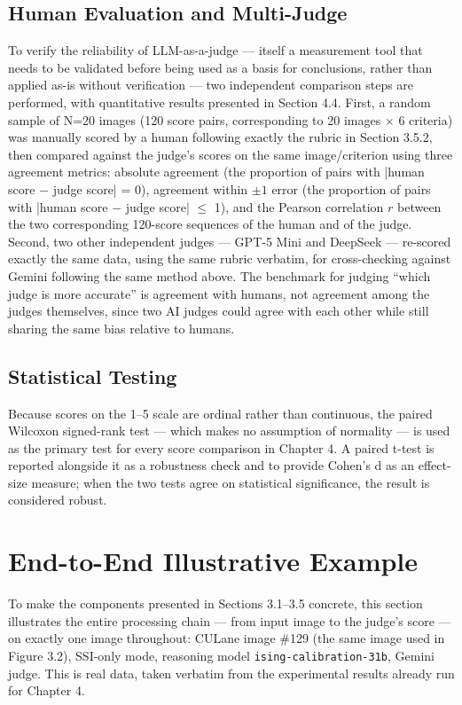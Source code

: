 \documentclass[12pt,a4paper]{report}
\begin{document}
\subsection{Human Evaluation and Multi-Judge}

To verify the reliability of LLM-as-a-judge --- itself a measurement tool that needs to be validated before being used as a basis for conclusions, rather than applied as-is without verification --- two independent comparison steps are performed, with quantitative results presented in Section 4.4. First, a random sample of N=20 images (120 score pairs, corresponding to 20 images $\times$ 6 criteria) was manually scored by a human following exactly the rubric in Section 3.5.2, then compared against the judge's scores on the same image/criterion using three agreement metrics: absolute agreement (the proportion of pairs with |human score $-$ judge score| = 0), agreement within $\pm 1$ error (the proportion of pairs with |human score $-$ judge score| $\le$ 1), and the Pearson correlation $r$ between the two corresponding 120-score sequences of the human and of the judge. Second, two other independent judges --- GPT-5 Mini and DeepSeek --- re-scored exactly the same data, using the same rubric verbatim, for cross-checking against Gemini following the same method above. The benchmark for judging ``which judge is more accurate'' is agreement with humans, not agreement among the judges themselves, since two AI judges could agree with each other while still sharing the same bias relative to humans.

\subsection{Statistical Testing}

Because scores on the 1--5 scale are ordinal rather than continuous, the paired Wilcoxon signed-rank test --- which makes no assumption of normality --- is used as the primary test for every score comparison in Chapter 4. A paired t-test is reported alongside it as a robustness check and to provide Cohen's d as an effect-size measure; when the two tests agree on statistical significance, the result is considered robust.

\section{End-to-End Illustrative Example}

To make the components presented in Sections 3.1--3.5 concrete, this section illustrates the entire processing chain --- from input image to the judge's score --- on exactly one image throughout: CULane image \#129 (the same image used in Figure 3.2), SSI-only mode, reasoning model \texttt{ising-calibration-31b}, Gemini judge. This is real data, taken verbatim from the experimental results already run for Chapter 4.
\end{document}
